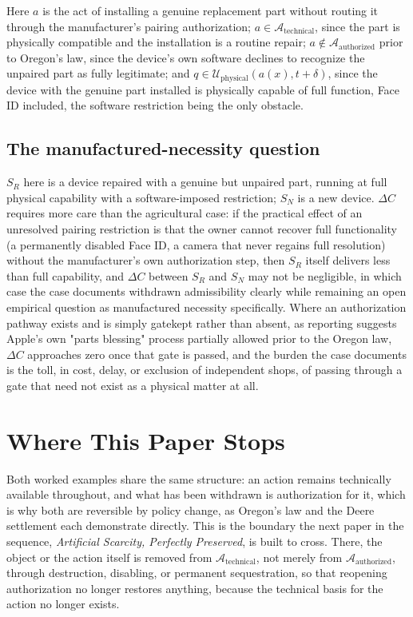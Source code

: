 \documentclass[11pt]{article}
\begin{document}
Here $a$ is the act of installing a genuine replacement part without routing it through the manufacturer's pairing authorization; $a \in \mathcal{A}_{\text{technical}}$, since the part is physically compatible and the installation is a routine repair; $a \notin \mathcal{A}_{\text{authorized}}$ prior to Oregon's law, since the device's own software declines to recognize the unpaired part as fully legitimate; and $q \in \mathcal{U}_{\text{physical}}(a(x), t+\delta)$, since the device with the genuine part installed is physically capable of full function, Face ID included, the software restriction being the only obstacle.

\subsection{The manufactured-necessity question}

$S_R$ here is a device repaired with a genuine but unpaired part, running at full physical capability with a software-imposed restriction; $S_N$ is a new device. $\Delta C$ requires more care than the agricultural case: if the practical effect of an unresolved pairing restriction is that the owner cannot recover full functionality (a permanently disabled Face ID, a camera that never regains full resolution) without the manufacturer's own authorization step, then $S_R$ itself delivers less than full capability, and $\Delta C$ between $S_R$ and $S_N$ may not be negligible, in which case the case documents withdrawn admissibility clearly while remaining an open empirical question as manufactured necessity specifically. Where an authorization pathway exists and is simply gatekept rather than absent, as reporting suggests Apple's own "parts blessing" process partially allowed prior to the Oregon law, $\Delta C$ approaches zero once that gate is passed, and the burden the case documents is the toll, in cost, delay, or exclusion of independent shops, of passing through a gate that need not exist as a physical matter at all.

\section{Where This Paper Stops}

Both worked examples share the same structure: an action remains technically available throughout, and what has been withdrawn is authorization for it, which is why both are reversible by policy change, as Oregon's law and the Deere settlement each demonstrate directly. This is the boundary the next paper in the sequence, \emph{Artificial Scarcity, Perfectly Preserved}, is built to cross. There, the object or the action itself is removed from $\mathcal{A}_{\text{technical}}$, not merely from $\mathcal{A}_{\text{authorized}}$, through destruction, disabling, or permanent sequestration, so that reopening authorization no longer restores anything, because the technical basis for the action no longer exists.
\end{document}
